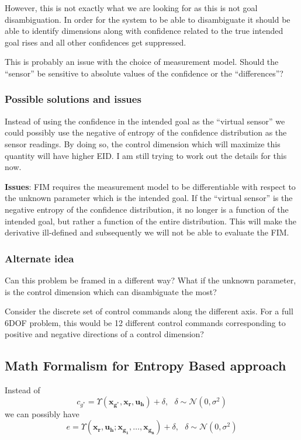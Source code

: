 \documentclass[]{article}
\begin{document}
However, this is not exactly what we are looking for as this is not goal disambiguation. In order for the system to be able to disambiguate it should be able to identify dimensions along with confidence related to the true intended goal rises and all other confidences get suppressed. 

This is probably an issue with the choice of measurement model. Should the ``sensor'' be sensitive to absolute values of the confidence or the ``differences''? 

\subsubsection*{Possible solutions and issues}

Instead of using the confidence in the intended goal as the ``virtual sensor'' we could possibly use the negative of entropy of the confidence distribution as the sensor readings. By doing so, the control dimension which will maximize this quantity will have higher EID. I am still trying to work out the details for this now. 

\textbf{Issues}: FIM requires the measurement model to be differentiable with respect to the unknown parameter which is the intended goal. If the ``virtual sensor'' is the negative entropy of the confidence distribution, it no longer is a function of the intended goal, but rather a function of the entire distribution. This will make the derivative ill-defined and subsequently we will not be able to evaluate the FIM. 

\subsubsection*{Alternate idea}

Can this problem be framed in a different way? What if the unknown parameter, is the control dimension which can disambiguate the most?

Consider the discrete set of control commands along the different axis. For a full 6DOF problem, this would be 12 different control commands corresponding to positive and negative directions of a control dimension? 

\subsection*{Math Formalism for Entropy Based approach}

Instead of 
\begin{equation*}
c_{g^*} = \Upsilon(\boldsymbol{x_{g^*}}, \boldsymbol{x_r}, \boldsymbol{u_h}) + \delta, ~~~ \delta \sim \mathcal{N}(0, \sigma^2) 
\end{equation*}
we can possibly have
\begin{equation*}
e = \Upsilon(\boldsymbol{x_r}, \boldsymbol{u_h}; \boldsymbol{x_{g_1}},\dots,\boldsymbol{x_{g_n}}) + \delta, ~~~ \delta \sim \mathcal{N}(0, \sigma^2)
\end{equation*}
\end{document}
